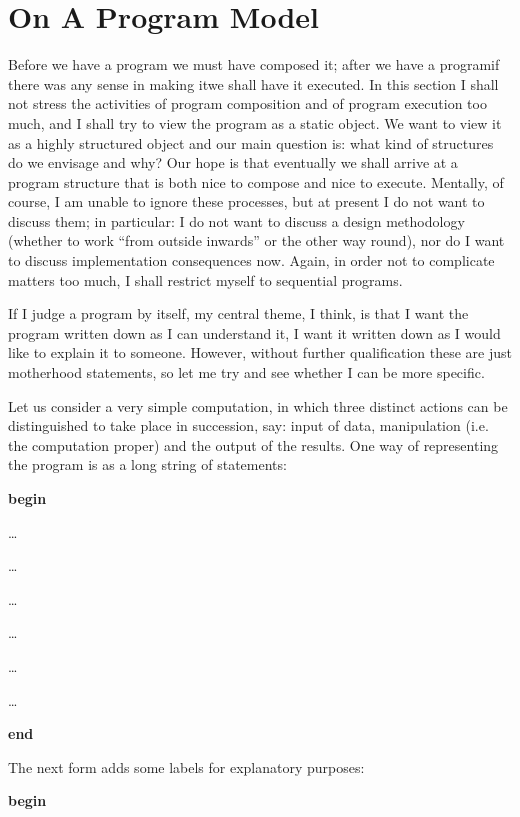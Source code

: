 \documentclass[twoside,11pt]{book}
\begin{document}
\section[On a program model]{On A Program Model}
\label{eq:program-model}

Before we have a program we must have composed it; after we have a program\textemdash{}if there was any sense in making it\textemdash{}we shall have it executed. In this section I shall not stress the activities of program composition and of program execution too much, and I shall try to view the program as a static object. We want to view it as a highly structured object and our main question is: what kind of structures do we envisage and why? Our hope is that eventually we shall arrive at a program structure that is both nice to compose and nice to execute. Mentally, of course, I am unable to ignore these processes, but at present I do not want to discuss them; in particular: I do not want to discuss a design methodology (whether to work ``from outside inwards'' or the other way round), nor do I want to discuss implementation consequences now. Again, in order not to complicate matters too much, I shall restrict myself to sequential programs.

If I judge a program by itself, my central theme, I think, is that I want the program written down as I can understand it, I want it written down as I would like to explain it to someone. However, without further qualification these are just motherhood statements, so let me try and see whether I can be more specific.

Let us consider a very simple computation, in which three distinct actions can be distinguished to take place in succession, say: input of data, manipulation (i.e. the computation proper) and the output of the results. One way of representing the program is as a long string of statements:

\noindent
\textbf{begin}

\noindent
\quad\dots

\noindent
\quad\dots

\noindent
\quad\dots

\noindent
\quad\dots

\noindent
\quad\dots

\noindent
\quad\dots

\noindent
\textbf{end}

The next form adds some labels for explanatory purposes:

\noindent
\tabto{10em}\textbf{begin}
\nopagebreak
\end{document}
